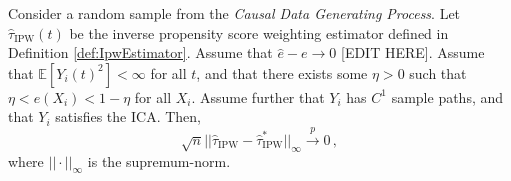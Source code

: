 \begin{lemma}\label{lem:IpwEstimatorConvergenceToOracle}
    Consider a random sample from the \emph{Causal Data Generating Process}. Let
    $\hat{\tau}_{\text{IPW}}(t)$ be the inverse propensity score weighting estimator defined in
    Definition \ref{def:IpwEstimator}. Assume that $\hat{e} - e \to 0$ [EDIT HERE]. Assume that
    $\mathbb{E}[Y_i(t)^2] < \infty$ for all $t$, and that there exists some $\eta > 0$ such that
    $\eta < e(X_i) < 1 - \eta$ for all $X_i$. Assume further that $Y_i$ has $C^1$ sample paths, and
    that $Y_i$ satisfies the ICA. Then,
    \[
        \sqrt{n} ||\hat{\tau}_{\text{IPW}} - \hat{\tau}_{\text{IPW}}^\ast||_\infty \overset{p}{\to} 0
        \,,
    \]
    where $||\cdot||_\infty$ is the supremum-norm.
\end{lemma}
